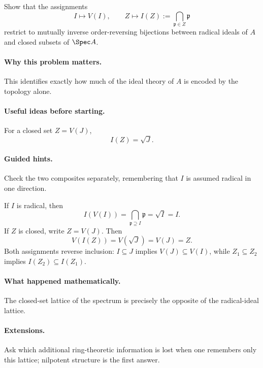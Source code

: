\begin{problem}
Show that the assignments
\[
I\longmapsto V(I),
\qquad
Z\longmapsto I(Z):=\bigcap_{\mathfrak p\in Z}\mathfrak p
\]
restrict to mutually inverse order-reversing bijections between radical ideals of $A$ and
closed subsets of $\Spec A$.
\end{problem}

\paragraph{Why this problem matters.}
This identifies exactly how much of the ideal theory of $A$ is encoded by the topology alone.

\paragraph{Useful ideas before starting.}
For a closed set $Z=V(J)$,
\[
I(Z)=\sqrt J.
\]

\paragraph{Guided hints.}
Check the two composites separately, remembering that $I$ is assumed radical in one direction.

\begin{solution}
If $I$ is radical, then
\[
I(V(I))
=
\bigcap_{\mathfrak p\supseteq I}\mathfrak p
=
\sqrt I
=
I.
\]
If $Z$ is closed, write $Z=V(J)$.  Then
\[
V(I(Z))
=
V(\sqrt J)
=
V(J)
=
Z.
\]
Both assignments reverse inclusion: $I\subseteq J$ implies $V(J)\subseteq V(I)$, while
$Z_1\subseteq Z_2$ implies $I(Z_2)\subseteq I(Z_1)$.
\end{solution}

\paragraph{What happened mathematically.}
The closed-set lattice of the spectrum is precisely the opposite of the radical-ideal lattice.

\paragraph{Extensions.}
Ask which additional ring-theoretic information is lost when one remembers only this lattice;
nilpotent structure is the first answer.

